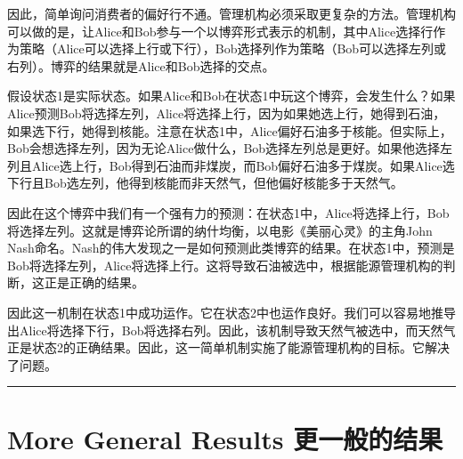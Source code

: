 \documentclass[12pt,a4paper]{article}
\newenvironment{translation}{%
  \par\vspace{2pt}\noindent%
  \color{transblue}%
  \ignorespaces
}{%
  \par\vspace{4pt}\hrule\vspace{6pt}%
}
\begin{document}
\begin{translation}
因此，简单询问消费者的偏好行不通。管理机构必须采取更复杂的方法。管理机构可以做的是，让Alice和Bob参与一个以博弈形式表示的机制，其中Alice选择行作为策略（Alice可以选择上行或下行），Bob选择列作为策略（Bob可以选择左列或右列）。博弈的结果就是Alice和Bob选择的交点。

假设状态1是实际状态。如果Alice和Bob在状态1中玩这个博弈，会发生什么？如果Alice预测Bob将选择左列，Alice将选择上行，因为如果她选上行，她得到石油，如果选下行，她得到核能。注意在状态1中，Alice偏好石油多于核能。但实际上，Bob会想选择左列，因为无论Alice做什么，Bob选择左列总是更好。如果他选择左列且Alice选上行，Bob得到石油而非煤炭，而Bob偏好石油多于煤炭。如果Alice选下行且Bob选左列，他得到核能而非天然气，但他偏好核能多于天然气。

因此在这个博弈中我们有一个强有力的预测：在状态1中，Alice将选择上行，Bob将选择左列。这就是博弈论所谓的纳什均衡，以电影《美丽心灵》的主角John Nash命名。Nash的伟大发现之一是如何预测此类博弈的结果。在状态1中，预测是Bob将选择左列，Alice将选择上行。这将导致石油被选中，根据能源管理机构的判断，这正是正确的结果。

因此这一机制在状态1中成功运作。它在状态2中也运作良好。我们可以容易地推导出Alice将选择下行，Bob将选择右列。因此，该机制导致天然气被选中，而天然气正是状态2的正确结果。因此，这一简单机制实施了能源管理机构的目标。它解决了问题。
\end{translation}

\section{More General Results \hfill 更一般的结果}
\end{document}
